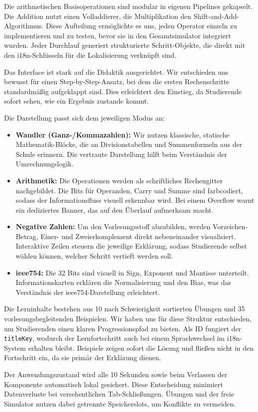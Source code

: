 Die arithmetischen Basisoperationen sind modular in eigenen Pipelines gekapselt. Die Addition nutzt einen Volladdierer, die Multiplikation den Shift-and-Add-Algorithmus. Diese Aufteilung ermöglichte es uns, jeden Operator einzeln zu implementieren und zu testen, bevor sie in den Gesamtsimulator integriert wurden. Jeder Durchlauf generiert strukturierte Schritt-Objekte, die direkt mit den i18n-Schlüsseln für die Lokalisierung verknüpft sind.


Das Interface ist stark auf die Didaktik ausgerichtet. Wir entschieden uns bewusst für einen Step-by-Step-Ansatz, bei dem die ersten Rechenschritte standardmäßig aufgeklappt sind. Dies erleichtert den Einstieg, da Studierende sofort sehen, wie ein Ergebnis zustande kommt.

Die Darstellung passt sich dem jeweiligen Modus an:

\begin{itemize}
  \item \textbf{Wandler (Ganz-/Kommazahlen):} Wir nutzen klassische, statische Mathematik-Blöcke, die an Divisionstabellen und Summenformeln aus der Schule erinnern. Die vertraute Darstellung hilft beim Verständnis der Umrechnungslogik.
  \item \textbf{Arithmetik:} Die Operationen werden als schriftliches Rechengitter nachgebildet. Die Bits für Operanden, Carry und Summe sind farbcodiert, sodass der Informationsfluss visuell erkennbar wird. Bei einem Overflow warnt ein dediziertes Banner, das auf den Überlauf aufmerksam macht.
  \item \textbf{Negative Zahlen:} Um den Vorlesungsstoff abzubilden, werden Vorzeichen-Betrag, Einer- und Zweierkomplement direkt nebeneinander visualisiert. Interaktive Zeilen steuern die jeweilige Erklärung, sodass Studierende selbst wählen können, welcher Schritt vertieft werden soll.
  \item \textbf{\gls{ieee754}:} Die 32 Bits sind visuell in Sign, Exponent und Mantisse unterteilt. Informationskarten erklären die Normalisierung und den Bias, was das Verständnis der \gls{ieee754}-Darstellung erleichtert.
\end{itemize}


Die Lerninhalte bestehen aus 10 nach Schwierigkeit sortierten Übungen und 35 vorlesungsbegleitenden Beispielen. Wir haben uns für diese Struktur entschieden, um Studierenden einen klaren Progressionspfad zu bieten. Als ID fungiert der \texttt{titleKey}, wodurch der Lernfortschritt auch bei einem Sprachwechsel im i18n-System erhalten bleibt. Beispiele zeigen sofort die Lösung und fließen nicht in den Fortschritt ein, da sie primär der Erklärung dienen.

Der Anwendungszustand wird alle 10 Sekunden sowie beim Verlassen der Komponente automatisch lokal gesichert. Diese Entscheidung minimiert Datenverluste bei versehentlichen Tab-Schließungen. Übungen und der freie Simulator nutzen dabei getrennte Speicherslots, um Konflikte zu vermeiden.


